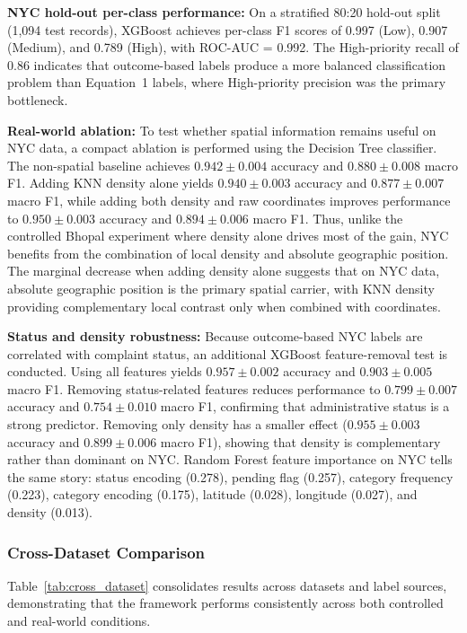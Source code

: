 \documentclass[conference]{IEEEtran}
\begin{document}
\textbf{NYC hold-out per-class performance:} On a stratified 80:20 hold-out split (1,094 test records), XGBoost achieves per-class F1 scores of 0.997 (Low), 0.907 (Medium), and 0.789 (High), with ROC-AUC = 0.992. The High-priority recall of 0.86 indicates that outcome-based labels produce a more balanced classification problem than Equation~1 labels, where High-priority precision was the primary bottleneck.

\textbf{Real-world ablation:} To test whether spatial information remains useful on NYC data, a compact ablation is performed using the Decision Tree classifier. The non-spatial baseline achieves $0.942 \pm 0.004$ accuracy and $0.880 \pm 0.008$ macro F1. Adding KNN density alone yields $0.940 \pm 0.003$ accuracy and $0.877 \pm 0.007$ macro F1, while adding both density and raw coordinates improves performance to $0.950 \pm 0.003$ accuracy and $0.894 \pm 0.006$ macro F1. Thus, unlike the controlled Bhopal experiment where density alone drives most of the gain, NYC benefits from the combination of local density and absolute geographic position. The marginal decrease when adding density alone suggests that on NYC data, absolute geographic position is the primary spatial carrier, with KNN density providing complementary local contrast only when combined with coordinates.

\textbf{Status and density robustness:} Because outcome-based NYC labels are correlated with complaint status, an additional XGBoost feature-removal test is conducted. Using all features yields $0.957 \pm 0.002$ accuracy and $0.903 \pm 0.005$ macro F1. Removing status-related features reduces performance to $0.799 \pm 0.007$ accuracy and $0.754 \pm 0.010$ macro F1, confirming that administrative status is a strong predictor. Removing only density has a smaller effect ($0.955 \pm 0.003$ accuracy and $0.899 \pm 0.006$ macro F1), showing that density is complementary rather than dominant on NYC. Random Forest feature importance on NYC tells the same story: status encoding (0.278), pending flag (0.257), category frequency (0.223), category encoding (0.175), latitude (0.028), longitude (0.027), and density (0.013).

\subsubsection{Cross-Dataset Comparison}

Table~\ref{tab:cross_dataset} consolidates results across datasets and label sources, demonstrating that the framework performs consistently across both controlled and real-world conditions.
\end{document}
